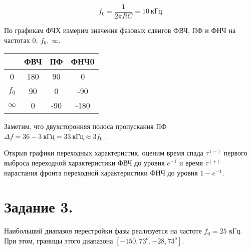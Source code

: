 	\begin{equation*}
		f_0 = \frac{1}{2 \pi RC} = 10 ~ \text{кГц}
	\end{equation*}

	\noindent По графикам ФЧХ измерим значения фазовых
	сдвигов ФВЧ, ПФ и ФНЧ на частотах $0, ~ f_0, ~ \infty$.

	\begin{table}[h!]
		\begin{center}
			\begin{tabular}{|c|c|c|c|}
				\hline
							& ФВЧ & ПФ  & ФНЧ0 \\ \hline
				0       	& 180 & 90  & 0    \\ \hline
				$f_0$   	& 90  & 0   & -90  \\ \hline
				$\infty$	& 0   & -90 & -180 \\ \hline
			\end{tabular}
		\end{center}
	\end{table}

	\noindent Заметим, что двухсторонняя полоса пропускания ПФ $\Delta f = 36 - 3 ~ \text{кГц} = 33 ~ \text{кГц} \approx 3f_0$ .


	Открыв графики переходных характеристик, оценим время спада $\tau^{(-)}$ первого выброса
	переходной характеристики ФВЧ до уровня $e^{-1}$ и время $\tau^{(+)}$ нарастания фронта переходной
	характеристики ФНЧ до уровня $1 - e^{-1}$.

	\begin{center}
	\end{center}

	\begin{center}
	\end{center}


	\section*{Задание 3.}

	\noindent Наибольший диапазон перестройки фазы реализуется на частоте $f_0 = 25$ кГц. При этом, границы этого диапазона
	$[-150, 73^o, -28,73^o]$.
	
